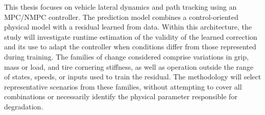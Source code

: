 \documentclass[12pt,a4paper]{report}
\begin{document}
%
%
%
%

This thesis focuses on vehicle lateral dynamics and path tracking using an MPC/NMPC controller. The prediction model combines a control-oriented physical model with a residual learned from data. Within this architecture, the study will investigate runtime estimation of the validity of the learned correction and its use to adapt the controller when conditions differ from those represented during training. The families of change considered comprise variations in grip, mass or load, and tire cornering stiffness, as well as operation outside the range of states, speeds, or inputs used to train the residual. The methodology will select representative scenarios from these families, without attempting to cover all combinations or necessarily identify the physical parameter responsible for degradation.
\end{document}
